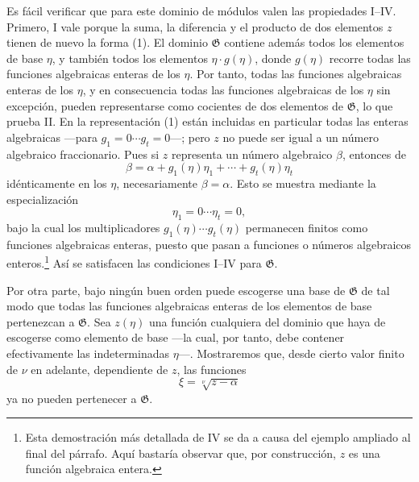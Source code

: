 \documentclass[11pt]{article}
\begin{document}
Es fácil verificar que para este dominio de módulos valen las propiedades I--IV. Primero, I vale porque la suma, la diferencia y el producto de dos elementos $z$ tienen de nuevo la forma (1). El dominio $\mathfrak G$ contiene además todos los elementos de base $\eta$, y también todos los elementos $\eta\cdot g(\eta)$, donde $g(\eta)$ recorre todas las funciones algebraicas enteras de los $\eta$. Por tanto, todas las funciones algebraicas enteras de los $\eta$, y en consecuencia todas las funciones algebraicas de los $\eta$ sin excepción, pueden representarse como cocientes de dos elementos de $\mathfrak G$, lo que prueba II. En la representación (1) están incluidas en particular todas las enteras algebraicas ---para $g_1=0\cdots g_t=0$---; pero $z$ no puede ser igual a un número algebraico fraccionario. Pues si $z$ representa un número algebraico $\beta$, entonces de
\[
 \beta=\alpha+g_1(\eta)\eta_1+\cdots+g_t(\eta)\eta_t
\]
idénticamente en los $\eta$, necesariamente $\beta=\alpha$. Esto se muestra mediante la especialización
\[
 \eta_1=0\cdots \eta_t=0,
\]
bajo la cual los multiplicadores $g_1(\eta)\cdots g_t(\eta)$ permanecen finitos como funciones algebraicas enteras, puesto que pasan a funciones o números algebraicos enteros.\footnote{Esta demostración más detallada de IV se da a causa del ejemplo ampliado al final del párrafo. Aquí bastaría observar que, por construcción, $z$ es una función algebraica entera.} Así se satisfacen las condiciones I--IV para $\mathfrak G$.

Por otra parte, bajo ningún buen orden puede escogerse una base de $\mathfrak G$ de tal modo que todas las funciones algebraicas enteras de los elementos de base pertenezcan a $\mathfrak G$. Sea $z(\eta)$ una función cualquiera del dominio que haya de escogerse como elemento de base ---la cual, por tanto, debe contener efectivamente las indeterminadas $\eta$---. Mostraremos que, desde cierto valor finito de $\nu$ en adelante, dependiente de $z$, las funciones
\[
 \xi=\sqrt[\nu]{z-\alpha}
\]
ya no pueden pertenecer a $\mathfrak G$.
\end{document}
